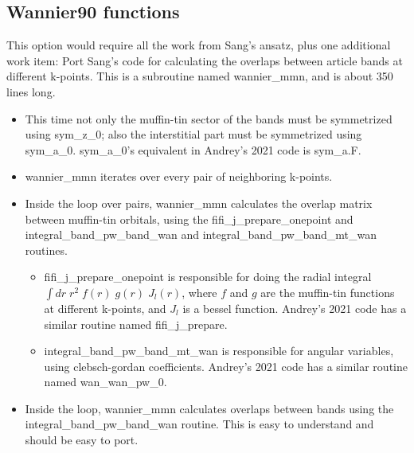 \documentclass[aps,prb,singlecolumn,preprintnumbers,amsmath,amssymb]{revtex4}
\begin{document}
\subsection{Wannier90 functions}
This option would require all the work from Sang's ansatz, plus one additional work item: Port Sang's code for calculating the overlaps between article bands at different k-points. This is a subroutine named wannier\_mmn, and is about 350 lines long. %
\begin{itemize}
\item This time not only the muffin-tin sector of the bands must be symmetrized using sym\_z\_0; also the interstitial part must be symmetrized  using sym\_a\_0.  sym\_a\_0's equivalent in Andrey's 2021 code is sym\_a.F.
\item wannier\_mmn iterates over every pair of neighboring k-points.
\item Inside the loop over pairs, wannier\_mmn calculates the overlap matrix between muffin-tin orbitals, using the fifi\_j\_prepare\_onepoint and integral\_band\_pw\_band\_wan and integral\_band\_pw\_band\_mt\_wan routines.
\begin{itemize}
\item fifi\_j\_prepare\_onepoint is responsible for doing the radial integral $\int {dr} \;r^2 \; f(r) \; g(r) \; J_l(r)$, where $f$ and $g$ are the muffin-tin functions at different k-points, and $J_l$ is a bessel function.  Andrey's 2021 code has a similar routine named fifi\_j\_prepare.
\item integral\_band\_pw\_band\_mt\_wan is responsible for angular variables, using clebsch-gordan coefficients.  Andrey's 2021 code has a similar routine named wan\_wan\_pw\_0.
%
%
\end{itemize}
\item Inside the loop, wannier\_mmn calculates overlaps between bands using the  integral\_band\_pw\_band\_wan routine.  This is easy to understand and should be easy to port.
\end{itemize}
\end{document}
